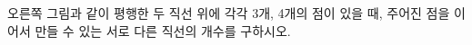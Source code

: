 \noindent\begin{minipage}[t]{0.58\linewidth}\vspace{0pt}\raggedright 오른쪽 그림과 같이 평행한 두 직선 위에 각각 3개, 4개의 점이 있을 때, 주어진 점을 이어서 만들 수 있는 서로 다른 직선의 개수를 구하시오.\end{minipage}\hfill\begin{minipage}[t]{0.4\linewidth}\vspace{0pt}\centering \resizebox{\ifdim\width>\linewidth\linewidth\else\width\fi}{!}{}\end{minipage}\par
